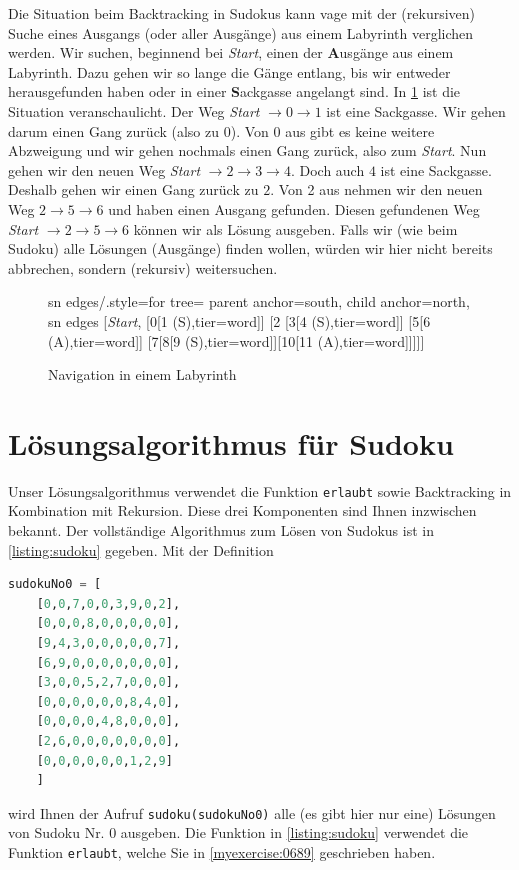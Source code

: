 \clearpage
\begin{myremark}\label{myremark:Metapher2}
	Die Situation beim Backtracking in Sudokus kann vage mit der (rekursiven) Suche eines Ausgangs (oder aller Ausgänge) aus einem Labyrinth verglichen werden. Wir suchen, beginnend bei \textit{Start}, einen der \textbf{A}usgänge aus einem Labyrinth. Dazu gehen wir so lange die Gänge entlang, bis wir entweder herausgefunden haben oder in einer \textbf{S}ackgasse angelangt sind. In \cref{fig:Labyrinth} ist die Situation veranschaulicht. Der Weg \textit{Start} $\to 0 \to 1$ ist eine Sackgasse. Wir gehen darum einen Gang zurück (also zu 0). Von $0$ aus gibt es keine weitere Abzweigung und wir gehen nochmals einen Gang zurück, also zum \textit{Start}. Nun gehen wir den neuen Weg \textit{Start} $\to 2\to 3 \to 4$. Doch auch $4$ ist eine Sackgasse. Deshalb gehen wir einen Gang zurück zu $2$. Von 2 aus nehmen wir den neuen Weg $2\to 5\to 6$ und haben einen Ausgang gefunden. Diesen gefundenen Weg \textit{Start} $\to 2\to 5\to 6$ können wir als Lösung ausgeben. Falls wir (wie beim Sudoku) alle Lösungen (Ausgänge) finden wollen, würden wir hier nicht bereits abbrechen, sondern (rekursiv) weitersuchen.
	\begin{figure}[H]
		\centering
		\begin{forest}
			sn edges/.style={for tree={
					parent anchor=south, child anchor=north}},
			sn edges
				[\textit{Start},
					[0[1 (S),tier=word]]
						[2
								[3[4 (S),tier=word]]
								[5[6 (A),tier=word]]
								[7[8[9 (S),tier=word]][10[11 (A),tier=word]]]]]
		\end{forest}
		\caption{Navigation in einem Labyrinth}
		\label{fig:Labyrinth}
	\end{figure}
\end{myremark}
\clearpage

\section{Lösungsalgorithmus für Sudoku}
Unser Lösungsalgorithmus verwendet die Funktion \lstinline|erlaubt| sowie Backtracking in Kombination mit Rekursion. Diese drei Komponenten sind Ihnen inzwischen bekannt. Der vollständige Algorithmus zum Lösen von Sudokus ist in \cref{listing:sudoku} gegeben. Mit der Definition
\begin{lstlisting}[language=Python,caption=Abspeichern von Sudoku-Gittern in Python,numbers=none]
  sudokuNo0 = [
    [0,0,7,0,0,3,9,0,2],
    [0,0,0,8,0,0,0,0,0],
    [9,4,3,0,0,0,0,0,7],
    [6,9,0,0,0,0,0,0,0],
    [3,0,0,5,2,7,0,0,0],
    [0,0,0,0,0,0,8,4,0],
    [0,0,0,0,4,8,0,0,0],
    [2,6,0,0,0,0,0,0,0],
    [0,0,0,0,0,0,1,2,9]
    ]
\end{lstlisting}
wird Ihnen der Aufruf \lstinline|sudoku(sudokuNo0)| alle (es gibt hier nur eine) Lösungen von Sudoku Nr. 0 ausgeben. Die Funktion in \cref{listing:sudoku} verwendet die Funktion \lstinline|erlaubt|, welche Sie in \cref{myexercise:0689} geschrieben haben.

